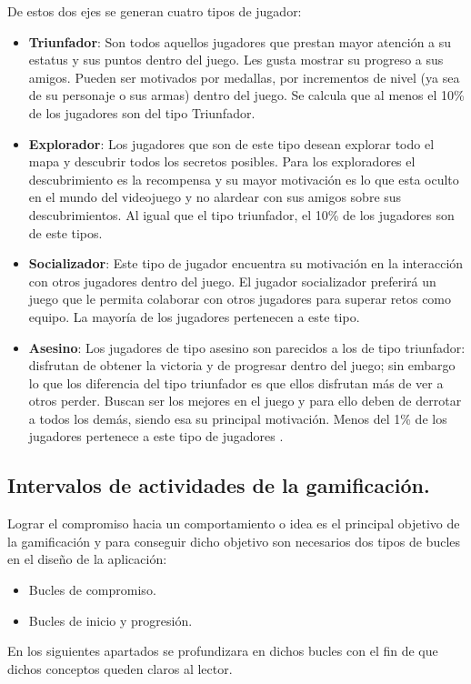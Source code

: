De estos dos ejes se generan cuatro tipos de jugador:
\begin{itemize}
	\item \textbf{Triunfador}: Son todos aquellos jugadores que prestan mayor 
	atención a su estatus y sus puntos dentro del juego. Les gusta mostrar su 
	progreso a sus amigos. Pueden ser motivados por medallas, por incrementos de 
	nivel (ya sea de su personaje o sus armas) dentro del juego. Se calcula que al 
	menos el 10\% de los jugadores son del tipo Triunfador.
	\item \textbf{Explorador}: Los jugadores que son de este tipo desean explorar 
	todo el mapa y descubrir todos los secretos posibles. Para los exploradores el 
	descubrimiento es la recompensa y su mayor motivación es lo que esta oculto en 
	el mundo del videojuego y no alardear con sus amigos sobre sus descubrimientos. 
	Al igual que el tipo triunfador, el 10\% de los jugadores son de este tipos.
	\item \textbf{Socializador}: Este tipo de jugador encuentra su motivación en la 
	interacción con otros jugadores dentro del juego. El jugador socializador 
	preferirá un juego que le permita colaborar con otros jugadores para superar 
	retos como equipo. La mayoría de los jugadores pertenecen a este tipo.
	\item \textbf{Asesino}: Los jugadores de tipo asesino son parecidos a los de 
	tipo triunfador: disfrutan de obtener la victoria y de progresar dentro del 
	juego; sin embargo lo que los diferencia del tipo triunfador es que ellos 
	disfrutan más de ver a otros perder. Buscan ser los mejores en el juego y para 
	ello deben de derrotar a todos los demás, siendo esa su principal motivación. 
	Menos del 1\% de los jugadores pertenece a este tipo de jugadores
	\cite{RefTipoJugadores}.
\end{itemize}

\subsection{Intervalos de actividades de la gamificación.}
Lograr el compromiso hacia un comportamiento o idea es el principal objetivo de 
la gamificación y para conseguir dicho objetivo son necesarios dos tipos de bucles 
en el diseño de la aplicación:
\begin{itemize}
	\item Bucles de compromiso. 
	\item Bucles de inicio y progresión.
\end{itemize}
En los siguientes apartados se profundizara en dichos bucles con el fin de que 
dichos conceptos queden claros al lector.

